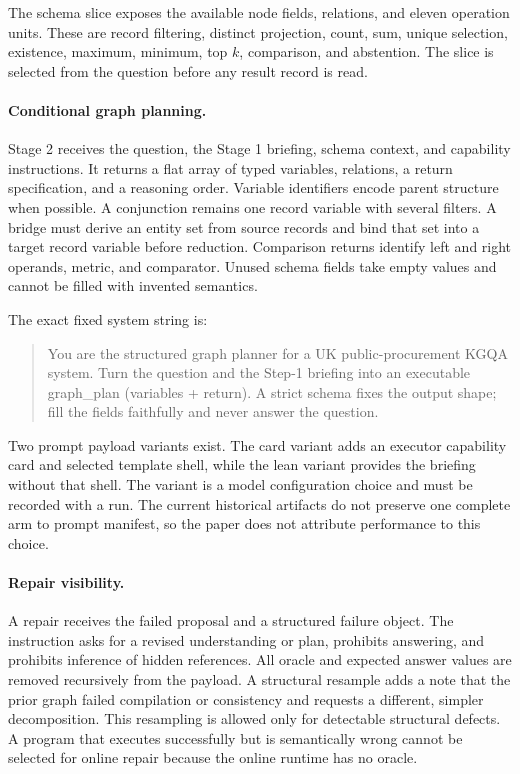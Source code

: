 \documentclass{article}
\begin{document}
The schema slice exposes the available node fields, relations, and eleven operation units.  These
are record filtering, distinct projection, count, sum, unique selection, existence, maximum,
minimum, top $k$, comparison, and abstention.  The slice is selected from the question before any
result record is read.

\paragraph{Conditional graph planning.}
Stage 2 receives the question, the Stage 1 briefing, schema context, and capability instructions.
It returns a flat array of typed variables, relations, a return specification, and a reasoning
order.  Variable identifiers encode parent structure when possible.  A conjunction remains one
record variable with several filters.  A bridge must derive an entity set from source records and
bind that set into a target record variable before reduction.  Comparison returns identify left and
right operands, metric, and comparator.  Unused schema fields take empty values and cannot be filled
with invented semantics.

The exact fixed system string is:
\begin{quote}\small
You are the structured graph planner for a UK public-procurement KGQA system. Turn the question and
the Step-1 briefing into an executable graph\_plan (variables + return). A strict schema fixes the
output shape; fill the fields faithfully and never answer the question.
\end{quote}

Two prompt payload variants exist.  The card variant adds an executor capability card and selected
template shell, while the lean variant provides the briefing without that shell.  The variant is a
model configuration choice and must be recorded with a run.  The current historical artifacts do
not preserve one complete arm to prompt manifest, so the paper does not attribute performance to
this choice.

\paragraph{Repair visibility.}
A repair receives the failed proposal and a structured failure object.  The instruction asks for a
revised understanding or plan, prohibits answering, and prohibits inference of hidden references.
All oracle and expected answer values are removed recursively from the payload.  A structural
resample adds a note that the prior graph failed compilation or consistency and requests a different,
simpler decomposition.  This resampling is allowed only for detectable structural defects.  A
program that executes successfully but is semantically wrong cannot be selected for online repair
because the online runtime has no oracle.
\end{document}
